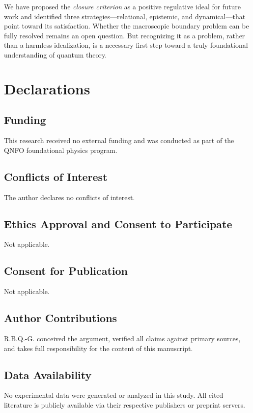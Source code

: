 \documentclass[pdflatex,sn-mathphys-num]{sn-jnl}%
\begin{document}
We have proposed the \emph{closure criterion} as a positive regulative ideal for future work and identified three strategies---relational, epistemic, and dynamical---that point toward its satisfaction. Whether the macroscopic boundary problem can be fully resolved remains an open question. But recognizing it as a problem, rather than a harmless idealization, is a necessary first step toward a truly foundational understanding of quantum theory.

\section*{Declarations}

\subsection*{Funding}
This research received no external funding and was conducted as part of the QNFO foundational physics program.

\subsection*{Conflicts of Interest}
The author declares no conflicts of interest.

\subsection*{Ethics Approval and Consent to Participate}
Not applicable.

\subsection*{Consent for Publication}
Not applicable.

\subsection*{Author Contributions}
R.B.Q.-G. conceived the argument, verified all claims against primary sources, and takes full responsibility for the content of this manuscript.

\subsection*{Data Availability}
No experimental data were generated or analyzed in this study. All cited literature is publicly available via their respective publishers or preprint servers.
\end{document}
